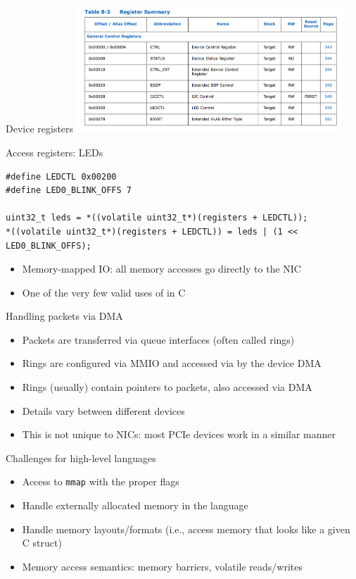 \documentclass[NET,english,aspectratio=169,notitleframe,draft]{tumbeamer}
\begin{document}
\begin{frame}{Device registers}
\centering\includegraphics[width=0.75\textwidth]{pics/registers}
\end{frame}

\begin{frame}[fragile=singleslide]{Access registers: LEDs}
\begin{verbatim}
#define LEDCTL 0x00200
#define LED0_BLINK_OFFS 7

uint32_t leds = *((volatile uint32_t*)(registers + LEDCTL));
*((volatile uint32_t*)(registers + LEDCTL)) = leds | (1 << LED0_BLINK_OFFS);
\end{verbatim}
\begin{itemize}
\item Memory-mapped IO: all memory accesses go directly to the NIC
\item One of the very few valid uses of  in C
\end{itemize}
\end{frame}


\begin{frame}{Handling packets via DMA}
\begin{itemize}
\item Packets are transferred via queue interfaces (often called rings)
\item Rings are configured via MMIO and accessed via by the device DMA
\item Rings (usually) contain pointers to packets, also accessed via DMA
\pause
\vspace{1em}
\item Details vary between different devices
\item This is not unique to NICs: most PCIe devices work in a similar manner
\end{itemize}
\end{frame}


\begin{frame}{Challenges for high-level languages}
\begin{itemize}
\item Access to \texttt{mmap} with the proper flags
\item Handle externally allocated memory in the language
\item Handle memory layouts/formats (i.e., access memory that looks like a given C struct)
\item Memory access semantics: memory barriers, volatile reads/writes
\end{itemize}
\end{frame}
\end{document}
